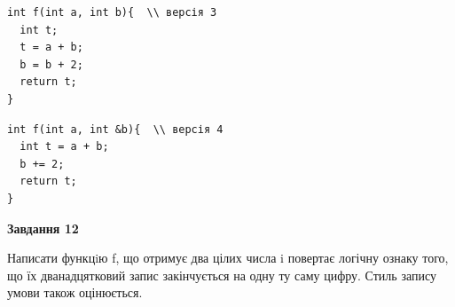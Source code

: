 \documentclass[12pt, ukrainian]{article}
\begin{document}
{\begin {large}
\begin{minipage}[t]{11.0cm}
\vspace{-8mm}\begin{verbatim}
int f(int a, int b){  \\ версія 3
  int t;
  t = a + b;
  b = b + 2;
  return t;
}
\end{verbatim}

\vspace{-8mm}\begin{verbatim}
int f(int a, int &b){  \\ версія 4
  int t = a + b;
  b += 2;
  return t;
}
\end{verbatim}



\begin{center}
\textbf{Завдання 12}
\end{center}

Написати функцiю f, що отримує два цілих числа i повертає логічну ознаку того, що їх дванадцятковий запис закінчується на одну ту саму цифру. Стиль запису умови також оцінюється.\par

\end{minipage}

\end {large}}
\newpage
\end{document}
